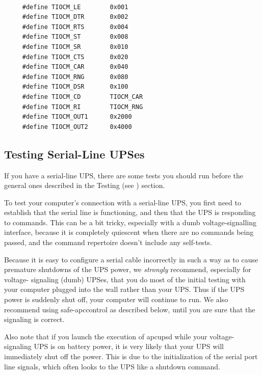 {{{{{{{{{{\label{index-Cables-218}

\footnotesize
\begin{verbatim}
     
     #define TIOCM_LE        0x001
     #define TIOCM_DTR       0x002
     #define TIOCM_RTS       0x004
     #define TIOCM_ST        0x008
     #define TIOCM_SR        0x010
     #define TIOCM_CTS       0x020
     #define TIOCM_CAR       0x040
     #define TIOCM_RNG       0x080
     #define TIOCM_DSR       0x100
     #define TIOCM_CD        TIOCM_CAR
     #define TIOCM_RI        TIOCM_RNG
     #define TIOCM_OUT1      0x2000
     #define TIOCM_OUT2      0x4000
\end{verbatim}
\normalsize

\label{Testing-Serial_002dLine-UPSes}

\subsection*{Testing Serial-Line UPSes}

\label{index-Testing_002c-Serial-219}
\label{index-Serial_002c-Testing-220}
If you have a serial-line UPS, there are some tests you should run before the
general ones described in the Testing (see 
) section.  

To test your computer's connection with a serial-line UPS, you first need to
establish that the serial line is functioning, and then that the UPS is
responding to commands.  This can be a bit tricky, especially with a dumb
voltage-signalling interface, because it is completely quiescent when there
are no commands being passed, and the command repertoire doesn't include any
self-tests.  

Because it is easy to configure a serial cable incorrectly in such a way as to
cause premature shutdowns of the UPS power, we {\it strongly} recommend,
especially for voltage- signaling (dumb) UPSes, that you do most of the
initial testing with your computer plugged into the wall rather than your UPS.
Thus if the UPS power is suddenly shut off, your computer will continue to
run. We also recommend using safe-apccontrol as described below, until you are
sure that the signaling is correct.  

Also note that if you launch the execution of apcupsd while your
voltage-signaling UPS is on battery power, it is very likely that your UPS
will immediately shut off the power. This is due to the initialization of the
serial port line signals, which often looks to the UPS like a shutdown
command.  

}}}}}}}}}}
